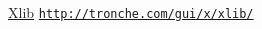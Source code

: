 \documentclass[12pt,a4paper,titlepage,final]{article}
\begin{document}
\begin{thebibliography}{1}

\href{http://tronche.com/gui/x/xlib/}{Xlib} \newline
\href{http://tronche.com/gui/x/xlib/}{\nolinkurl{http://tronche.com/gui/x/xlib/}}

\end{thebibliography}

\end{document}
